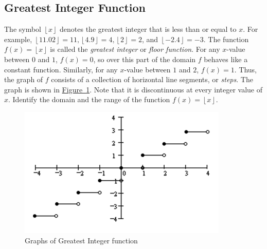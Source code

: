 \documentclass[10pt,]{book}
\theoremstyle{ptxdefinitionnotitle}
\theoremstyle{ptxdefinitiontitle}
\numberwithin{equation}{section}
\begin{document}
\subsection[{Greatest Integer Function}]{Greatest Integer Function}\label{subsection-13}
\hypertarget{p-60}{}%
The symbol \(\left\lfloor x \right\rfloor\) denotes the greatest integer that is less than or equal to \(x\).  For example,  \(\left\lfloor 11.02 \right\rfloor = 11, \left\lfloor 4.9 \right\rfloor = 4, \left\lfloor 2 \right\rfloor = 2\),  and \(\left\lfloor -2.4 \right\rfloor = -3\).  The function \(f(x) = \left\lfloor x \right\rfloor\) is called the \emph{greatest integer} or \emph{floor function}. For any \(x\)-value between \(0\) and \(1\), \(f(x) = 0\), so over this part of the domain \(f\) behaves like a constant function. Similarly, for any \(x\)-value between \(1\) and \(2\),  \(f(x) = 1\). Thus, the graph of \(f\) consists of a collection of horizontal line segments, or \emph{steps}. The graph is shown in \hyperref[chapter02-section02-floor]{Figure~\ref{chapter02-section02-floor}}.  Note that it is discontinuous at every integer value of \(x\).  Identify the domain and the range of the function \(f(x) = \left\lfloor x \right\rfloor\).%
\begin{figure}
\centering
\includegraphics[width=1\linewidth]{./src/images/chapter02/chapter02section02-floor.png}
\caption{Graphs of Greatest Integer function\label{chapter02-section02-floor}}
\end{figure}
\typeout{************************************************}
\typeout{************************************************}
\end{document}
